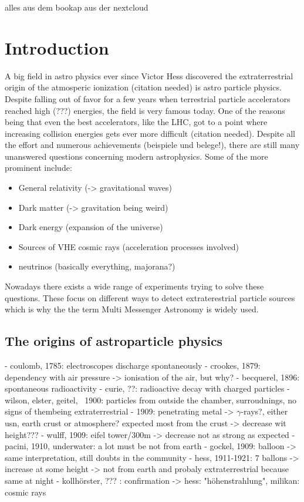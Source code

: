 alles aus dem bookap aus der nextcloud

\chapter{Introduction}

A big field in astro physics ever since Victor Hess discovered
the extraterrestrial origin of the atmosperic ionization (citation needed)
is astro particle physics. Despite falling out of favor for a few years
when terrestrial particle accelerators reached high (???) energies,
the field is very famous today. One of the reasons being that
even the best accelerators, like the LHC, got to a point where
increasing collision energies gets ever more difficult (citation needed).
Despite all the effort and numerous achievements (beispiele und belege!),
there are still many unanswered questions concerning modern
astrophysics. Some of the more prominent include:
\begin{itemize}
    \item{General relativity (-> gravitational waves)}
    \item{Dark matter (-> gravitation being weird)}
    \item{Dark energy (expansion of the universe)}
    \item{Sources of VHE cosmic rays (acceleration processes involved)}
    \item{neutrinos (basically everything, majorana?)}
\end{itemize}

Nowadays there exists a wide range of experiments trying to
solve these questions. These focus on different ways to detect
extraterestrial particle sources which is why the
the term Multi Messenger Astronomy is widely used.


\section{The origins of astroparticle physics}
- coulomb, 1785: electroscopes discharge spontaneously
- crookes, 1879: dependency with air pressure -> ionisation of the air, but why?
- becquerel, 1896: spontaneous radioactivity
- curie, ??: radioactive decay with charged particles
- wilson, elster, geitel, ~1900: particles from outside the chamber, surroudnings, no signs of thembeing extraterrestrial
- 1909: penetrating metal -> $\gamma$-rays?, either usn, earth crust or atmosphere? expected most from the crust -> decrease wit height???
- wulff, 1909: eifel tower/300m -> decrease not as strong as expected
- pacini, 1910, underwater: a lot must be not from earth
- gockel, 1909: balloon -> same interpretation, still doubts in the community
- hess, 1911-1921: 7 ballons -> increase at some height -> not from earth and probaly extraterrestrial because same at night
- kollhörster, ??? : confirmation
-> hess: "höhenstrahlung", milikan: cosmic rays


